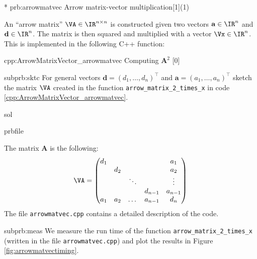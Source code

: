 \begin{samproblem}*
  {prb:arrowmatvec}
  {Arrow matrix-vector multiplication}[1](1)
  {
    An ``arrow matrix'' $\VA \in \IR^{n \times n}$ is constructed given two
    vectors $\mathbf{a} \in \IR^n$ and $\mathbf{d} \in \IR^n$.
    The matrix is then squared and multiplied with a vector $\Vx \in \IR^n$.
    This is implemented in the
    following C++ function:
    \begin{samcode}[C++11-code]{cpp:ArrowMatrixVector_arrowmatvec}
      {Computing $\mathbf{A}^2$}
      [0]
    \end{samcode}
  }

  \begin{subproblem}{subprb:sktc}
  For general vectors $\mathbf{d} = (d_1, \dots, d_n)^\top$ and
  $\mathbf{a} = (a_1, \dots, a_n)^\top$
  sketch the matrix $\VA$ created in the function \texttt{arrow\_matrix\_2\_times\_x}
  in code \ref{cpp:ArrowMatrixVector_arrowmatvec}.

  \begin{samwriteprbpart}{sol}
    \begin{writeverbatim}{prbfile}
      \begin{samsolution}
        The matrix $\mathbf{A}$ is the following:
        \begin{align}
          \VA=\begin{pmatrix}
            d_1 &     &        &         & a_1     \\
            & d_2 &        &         & a_2     \\
            &     & \ddots &         & \vdots  \\
            &     &        & d_{n-1} & a_{n-1} \\
            a_1 & a_2 & \dots  & a_{n-1} & d_n     \\
          \end{pmatrix}
        \end{align}
        The file \texttt{arrowmatvec.cpp} contains a detailed description of the code.
      \end{samsolution}
    \end{writeverbatim}
  \end{samwriteprbpart}
\end{subproblem}

\begin{subproblem}{subprb:meas}
  We measure the run time of the function \texttt{arrow\_matrix\_2\_times\_x} (written in the
  file \texttt{arrowmatvec.cpp})
  and plot the results in Figure \ref{fig:arrowmatvectiming}.


\end{subproblem}
\end{samproblem}
